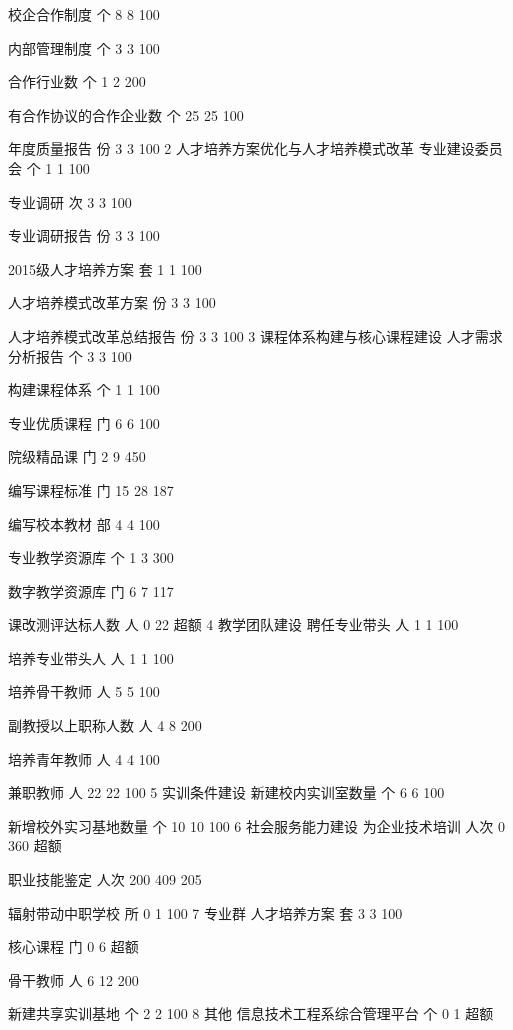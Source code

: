 校企合作制度
个
8
8
100%


内部管理制度
个
3
3
100%


合作行业数
个
1
2
200%


有合作协议的合作企业数
个
25
25
100%


年度质量报告
份
3
3
100%
2
人才培养方案优化与人才培养模式改革
专业建设委员会
个
1
1
100%


专业调研
次
3
3
100%


专业调研报告
份
3
3
100%


2015级人才培养方案
套
1
1
100%


人才培养模式改革方案
份
3
3
100%


人才培养模式改革总结报告
份
3
3
100%
3
课程体系构建与核心课程建设
人才需求分析报告
个
3
3
100%


构建课程体系
个
1
1
100%


专业优质课程
门
6
6
100%


院级精品课
门
2
9
450%


编写课程标准
门
15
28
187%


编写校本教材
部
4
4
100%


专业教学资源库
个
1
3
300%


数字教学资源库
门
6
7
117%


课改测评达标人数
人
0
22
超额
4
教学团队建设
聘任专业带头
人
1
1
100%


培养专业带头人
人
1
1
100%


培养骨干教师
人
5
5
100%


副教授以上职称人数
人
4
8
200%


培养青年教师
人
4
4
100%


兼职教师
人
22
22
100%
5
实训条件建设
新建校内实训室数量
个
6
6
100%


新增校外实习基地数量
个
10
10
100%
6
社会服务能力建设
为企业技术培训
人次
0
360
超额


职业技能鉴定
人次
200
409
205%


辐射带动中职学校
所
0
1
100%
7
专业群
人才培养方案
套
3
3
100%


核心课程
门
0
6
超额


骨干教师
人
6
12
200%


新建共享实训基地
个
2
2
100%
8
其他
信息技术工程系综合管理平台
个
0
1
超额


